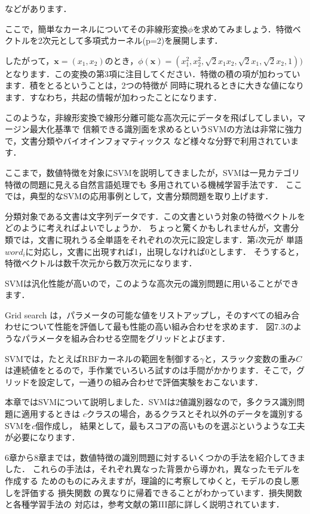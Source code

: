 などがあります．


ここで，簡単なカーネルについてその非線形変換$\phi$を求めてみましょう．特徴ベクトルを2次元として多項式カーネル(p=2)を展開します．

したがって，$\bm{x}=(x_1, x_2)$のとき，$\phi(\bm{x})=(x_1^2, x_2^2, \sqrt{2} x_1 x_2, \sqrt{2} x_1, \sqrt{2} x_2, 1) )$
となります．この変換の第3項に注目してください．特徴の積の項が加わっています．積をとるということは，2つの特徴が
同時に現れるときに大きな値になります．すなわち，共起の情報が加わったことになります．

このような，非線形変換で線形分離可能な高次元にデータを飛ばしてしまい，マージン最大化基準で
信頼できる識別面を求めるというSVMの方法は非常に強力で，文書分類やバイオインフォマティックス
など様々な分野で利用されています．


ここまで，数値特徴を対象にSVMを説明してきましたが，SVMは一見カテゴリ特徴の問題に見える自然言語処理でも
多用されている機械学習手法です．
ここでは，典型的なSVMの応用事例として，文書分類問題を取り上げます．

分類対象である文書は文字列データです．この文書という対象の特徴ベクトルをどのように考えればよいでしょうか．
ちょっと驚くかもしれませんが，文書分類では，文書に現れうる全単語をそれぞれの次元に設定します．第$i$次元が
単語$word_i$に対応し，文書に出現すれば1，出現しなければ0とします．
そうすると，特徴ベクトルは数千次元から数万次元になります．

SVMは汎化性能が高いので，このような高次元の識別問題に用いることができます．


Grid search は，パラメータの可能な値をリストアップし，そのすべての組み合わせについて性能を評価して最も性能の高い組み合わせを求めます．
図7.3のようなパラメータを組み合わせる空間をグリッドとよびます．

SVMでは，たとえばRBFカーネルの範囲を制御する$\gamma$と，スラック変数の重み$C$は連続値をとるので，手作業でいろいろ試すのは手間がかかります．そこで，グリッドを設定して，一通りの組み合わせで評価実験をおこないます．


本章ではSVMについて説明しました．SVMは2値識別器なので，多クラス識別問題に適用するときは
$c$クラスの場合，あるクラスとそれ以外のデータを識別するSVMを$c$個作成し，
結果として，最もスコアの高いものを選ぶというような工夫が必要になります．

6章から8章までは，数値特徴の識別問題に対するいくつかの手法を紹介してきました．
これらの手法は，それぞれ異なった背景から導かれ，異なったモデルを作成する
ためのものにみえますが，理論的に考察してゆくと，モデルの良し悪しを評価する
損失関数
の異なりに帰着できることがわかっています．損失関数と各種学習手法の
対応は，参考文献\cite{sugiyama13}の第III部に詳しく説明されています．

